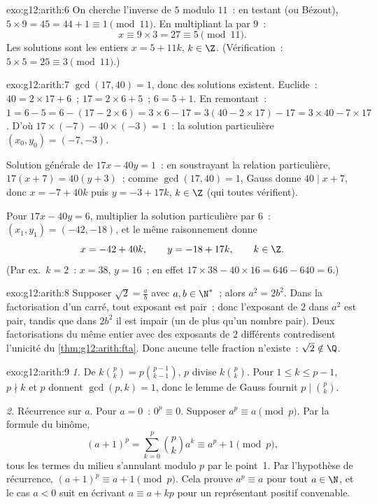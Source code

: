 \begin{solution}{exo:g12:arith:6}
On cherche l'inverse de $5$ modulo $11$~: en testant (ou Bézout),
$5 \times 9 = 45 = 44 + 1 \equiv 1 \pmod{11}$. En multipliant la
 par $9$~:
\[
x \equiv 9 \times 3 = 27 \equiv 5 \pmod{11}.
\]
Les solutions sont les entiers $x = 5 + 11k$, $k \in \Z$. (Vérification~:
$5\times5 = 25 \equiv 3 \pmod{11}$.)
\end{solution}

\begin{solution}{exo:g12:arith:7}
$\gcd(17, 40) = 1$, donc des solutions existent. Euclide~:
$40 = 2\times17 + 6$~; $17 = 2\times6 + 5$~; $6 = 5 + 1$. En remontant~:
$1 = 6 - 5 = 6 - (17 - 2\times6) = 3\times6 - 17
= 3(40 - 2\times17) - 17 = 3\times40 - 7\times17$. D'où
$17\times(-7) - 40\times(-3) = 1$~: la solution particulière
$(x_0, y_0) = (-7, -3)$.

Solution générale de $17x - 40y = 1$~: en soustrayant la relation
particulière, $17(x + 7) = 40(y + 3)$~; comme $\gcd(17, 40) = 1$, Gauss
donne $40 \mid x + 7$, donc $x = -7 + 40k$ puis $y = -3 + 17k$,
$k \in \Z$ (qui toutes vérifient).

Pour $17x - 40y = 6$, multiplier la solution particulière par $6$~:
$(x_1, y_1) = (-42, -18)$, et le même raisonnement donne
\[
x = -42 + 40k, \qquad y = -18 + 17k, \qquad k \in \Z .
\]
(Par ex.\ $k = 2$~: $x = 38$, $y = 16$~; en effet $17\times38 - 40\times16
= 646 - 640 = 6$.)
\end{solution}

\begin{solution}{exo:g12:arith:8}
Supposer $\sqrt2 = \frac ab$ avec $a, b \in \N^*$~; alors $a^2 = 2b^2$.
Dans la factorisation d'un carré, tout exposant est pair~; donc
l'exposant de $2$ dans $a^2$ est pair, tandis que dans $2b^2$ il est
impair (un de plus qu'un nombre pair). Deux factorisations du même entier
avec des exposants de $2$ différents contredisent l'unicité du
\cref{thm:g12:arith:fta}. Donc aucune telle fraction n'existe~:
$\sqrt2 \notin \Q$.
\end{solution}

\begin{solution}{exo:g12:arith:9}
\emph{1.} De $k\binom pk = p \binom{p-1}{k-1}$, $p$ divise
$k\binom pk$. Pour $1 \leq k \leq p-1$, $p \nmid k$ et $p$  donnent
$\gcd(p, k) = 1$, donc le lemme de Gauss fournit $p \mid \binom pk$.

\emph{2.} Récurrence sur $a$. Pour $a = 0$~: $0^p \equiv 0$. Supposer
$a^p \equiv a \pmod p$. Par la formule du binôme,
\[
(a+1)^p = \sum_{k=0}^{p} \binom pk a^k
\equiv a^p + 1 \pmod p,
\]
tous les termes du milieu s'annulant modulo $p$ par le point~1. Par
l'hypothèse de récurrence, $(a+1)^p \equiv a + 1 \pmod p$. Cela prouve
$a^p \equiv a$ pour tout $a \in \N$, et le cas $a < 0$ suit en écrivant
$a \equiv a + kp$ pour un représentant positif convenable.
\end{solution}

